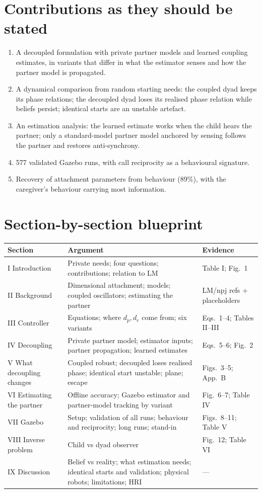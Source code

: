 \documentclass[10pt,a4paper]{article}
\begin{document}
\section{Contributions as they should be stated}
\begin{enumerate}[leftmargin=1.6em]
\item A decoupled formulation with private partner models and learned coupling estimates, in variants that differ in what the estimator senses and how the partner model is propagated.
\item A dynamical comparison from random starting needs: the coupled dyad keeps its phase relations; the decoupled dyad loses its realised phase relation while beliefs persist; identical starts are an unstable artefact.
\item An estimation analysis: the learned estimate works when the child hears the partner; only a standard-model partner model anchored by sensing follows the partner and restores anti-synchrony.
\item 577 validated Gazebo runs, with call reciprocity as a behavioural signature.
\item Recovery of attachment parameters from behaviour (89\%), with the caregiver's behaviour carrying most information.
\end{enumerate}

\section{Section-by-section blueprint}
\begin{tabularx}{\textwidth}{@{}p{3.3cm}Lp{3.2cm}@{}}
\toprule
Section & Argument & Evidence \\
\midrule
I Introduction & Private needs; four questions; contributions; relation to LM & Table I; Fig.~1 \\
II Background & Dimensional attachment; models; coupled oscillators; estimating the partner & LM/npj refs + placeholders \\
III Controller & Equations; where $d_p,d_e$ come from; six variants & Eqs.~1--4; Tables II--III \\
IV Decoupling & Private partner model; estimator inputs; partner propagation; learned estimates & Eqs.~5--6; Fig.~2 \\
V What decoupling changes & Coupled robust; decoupled loses realised phase; identical start unstable; plane; escape & Figs.~3--5; App.~B \\
VI Estimating the partner & Offline accuracy; Gazebo estimator and partner-model tracking by variant & Fig.~6--7; Table IV \\
VII Gazebo & Setup; validation of all runs; behaviour and reciprocity; long runs; stand-in & Figs.~8--11; Table V \\
VIII Inverse problem & Child vs dyad observer & Fig.~12; Table VI \\
IX Discussion & Belief vs reality; what estimation needs; identical starts and validation; physical robots; limitations; HRI & --- \\
\bottomrule
\end{tabularx}
\end{document}

